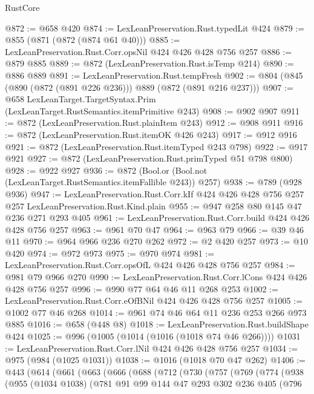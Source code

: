 \begin{lexlean}{RustCore}
\begin{coremodule}
@872 := @658 @420
@874 := LexLeanPreservation.Rust.typedLit @424
@879 := @855 (@871 (@872 (@874 @61 @40)))
@885 := LexLeanPreservation.Rust.Corr.opsNil @424 @426 @428 @756 @257
@886 := @879 @885
@889 := @872 (LexLeanPreservation.Rust.isTemp @214)
@890 := @886 @889
@891 := LexLeanPreservation.Rust.tempFresh
@902 := @804 (@845 (@890 (@872 (@891 @226 @236))) @889 (@872 (@891 @216 @237)))
@907 := @658 LexLeanTarget.TargetSyntax.Prim (LexLeanTarget.RustSemantics.itemPrimitive @243)
@908 := @902 @907
@911 := @872 (LexLeanPreservation.Rust.plainItem @243)
@912 := @908 @911
@916 := @872 (LexLeanPreservation.Rust.itemOK @426 @243)
@917 := @912 @916
@921 := @872 (LexLeanPreservation.Rust.itemTyped @243 @798)
@922 := @917 @921
@927 := @872 (LexLeanPreservation.Rust.primTyped @51 @798 @800)
@928 := @922 @927
@936 := @872 (Bool.or (Bool.not (LexLeanTarget.RustSemantics.itemFallible @243)) @257)
@938 := @789 (@928 @936)
@947 := LexLeanPreservation.Rust.Corr.kIf
    @424
    @426
    @428
    @756
    @257
    @257
    LexLeanPreservation.Rust.Kind.plain
@955 := @947 @258 @80 @145 @47 @236 @271 @293 @405
@961 := LexLeanPreservation.Rust.Corr.build @424 @426 @428 @756 @257
@963 := @961 @70 @47
@964 := @963 @79
@966 := @39 @46 @11
@970 := @964 @966 @236 @270 @262
@972 := @2 @420 @257
@973 := @10 @420
@974 := @972 @973
@975 := @970 @974
@981 := LexLeanPreservation.Rust.Corr.opsOfL @424 @426 @428 @756 @257
@984 := @981 @79 @966 @270
@990 := LexLeanPreservation.Rust.Corr.lCons @424 @426 @428 @756 @257
@996 := @990 @77 @64 @46 @11 @268 @253
@1002 := LexLeanPreservation.Rust.Corr.eOfBNil @424 @426 @428 @756 @257
@1005 := @1002 @77 @46 @268
@1014 := @961 @74 @46 @64 @11 @236 @253 @266 @973 @885
@1016 := @658 (@448 @8)
@1018 := LexLeanPreservation.Rust.buildShape @424
@1025 := @996 (@1005 (@1014 (@1016 (@1018 @74 @46 @266))))
@1031 := LexLeanPreservation.Rust.Corr.lNil @424 @426 @428 @756 @257
@1034 := @975 (@984 (@1025 @1031))
@1038 := @1016 (@1018 @70 @47 @262)
@1406 := @443
    (@614
      (@661
        (@663
          (@666
            (@688
              (@712
                (@730
                  (@757
                    (@769
                      (@774
                        (@938
                          (@955
                            (@1034 @1038)
                            (@781
                              @91
                              @99
                              @144
                              @47
                              @293
                              @302
                              @236
                              @405
                              (@796

\end{coremodule}
\end{lexlean}
